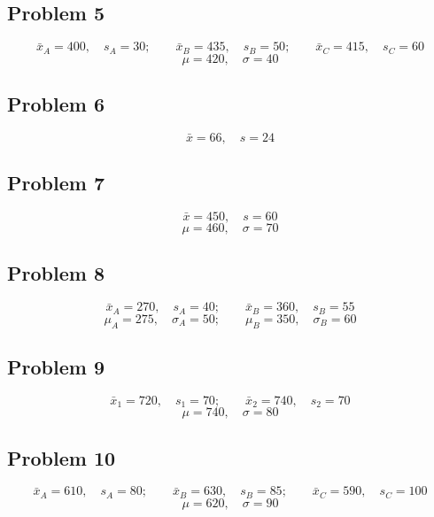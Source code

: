 \subsection*{Problem 5}
\[
\bar{x}_{A} = 400,\quad s_{A} = 30;\qquad \bar{x}_{B} = 435,\quad s_{B} = 50;\qquad \bar{x}_{C} = 415,\quad s_{C} = 60
\]
\[
\mu = 420,\quad \sigma = 40
\]

\subsection*{Problem 6}
\[
\bar{x} = 66,\quad s = 24
\]

\subsection*{Problem 7}
\[
\bar{x} = 450,\quad s = 60
\]
\[
\mu = 460,\quad \sigma = 70
\]

\subsection*{Problem 8}
\[
\bar{x}_{A} = 270,\quad s_{A} = 40;\qquad \bar{x}_{B} = 360,\quad s_{B} = 55
\]
\[
\mu_{A} = 275,\quad \sigma_{A} = 50;\qquad \mu_{B} = 350,\quad \sigma_{B} = 60
\]

\subsection*{Problem 9}
\[
\bar{x}_{1} = 720,\quad s_{1} = 70;\qquad \bar{x}_{2} = 740,\quad s_{2} = 70
\]
\[
\mu = 740,\quad \sigma = 80
\]

\subsection*{Problem 10}
\[
\bar{x}_{A} = 610,\quad s_{A} = 80;\qquad \bar{x}_{B} = 630,\quad s_{B} = 85;\qquad \bar{x}_{C} = 590,\quad s_{C} = 100
\]
\[
\mu = 620,\quad \sigma = 90
\]


